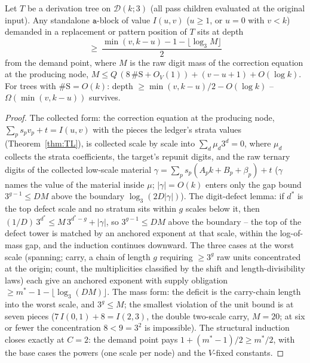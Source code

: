 \documentclass[runningheads,envcountsect]{llncs}
\begin{document}
\begin{theorem}
    \label{dich:thm:ATOM}
    Let $T$ be a derivation tree on $\mathcal D(k;3)$ (all pass children evaluated at the original input). Any standalone $\mathtt a$-block of value $I(u,v)$ ($u \ge 1$, or $u = 0$ with $v < k$) demanded in a replacement or pattern position of $T$ sits at depth
    \begin{equation*}
        \ge\ \frac{\min(v, k-u) - 1 - \lfloor \log_3 M \rfloor}{2}
    \end{equation*}
    from the demand point, where $M$ is the raw digit mass of the correction equation at the producing node, $M \le Q\,(8\,\#\mathrm{S} + O_V(1)) + (v - u + 1) + O(\log k)$. For trees with $\#\mathrm{S} = O(k)$: depth $\ge \min(v, k-u)/2 - O(\log k)$ -- $\Omega(\min(v, k{-}u))$ survives.
\end{theorem}

\begin{proof}
    The collected form: the correction equation at the producing node, $\sum_p s_p v_p + t = I(u,v)$ with the pieces the ledger's strata values (Theorem~\ref{thm:TL}), is collected scale by scale into $\sum_d \mu_d 3^{d} = 0$, where $\mu_d$ collects the strata coefficients, the target's repunit digits, and the raw ternary digits of the collected low-scale material $\gamma = \sum_p s_p(A_p k + B_p + \beta_p) + t$ ($\gamma$ names the value of the material inside $\mu$; $|\gamma| = O(k)$ enters only the gap bound $3^{g-1} \le D M$ above the boundary $\log_3(2 D |\gamma|)$). The digit-defect lemma: if $d^{*}$ is the top defect scale and no stratum sits within $g$ scales below it, then $(1/D)\,3^{d^{*}} \le M\,3^{d^{*}-g} + |\gamma|$, so $3^{g-1} \le D M$ above the boundary -- the top of the defect tower is matched by an anchored exponent at that scale, within the log-of-mass gap, and the induction continues downward. The three cases at the worst scale (spanning; carry, a chain of length $g$ requiring $\ge 3^{g}$ raw units concentrated at the origin; count, the multiplicities classified by the shift and length-divisibility laws) each give an anchored exponent with supply obligation $\ge m^{*} - 1 - \lfloor \log_3 (D M) \rfloor$. The mass form: the deficit is the carry-chain length into the worst scale, and $3^{g} \le M$; the smallest violation of the unit bound is at seven pieces ($7\,I(0,1) + 8 = I(2,3)$, the double two-scale carry, $M = 20$; at six or fewer the concentration $8 < 9 = 3^{2}$ is impossible). The structural induction closes exactly at $C = 2$: the demand point pays $1 + (m^{*} - 1)/2 \ge m^{*}/2$, with the base cases the powers (one scale per node) and the $V$-fixed constants.
\end{proof}
\end{document}
